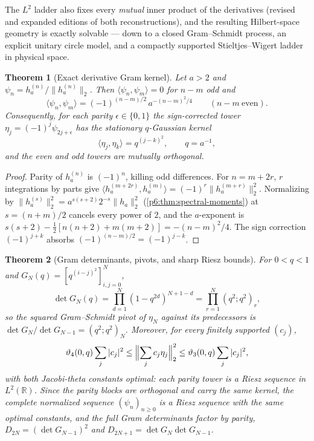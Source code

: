 \documentclass[11pt,oneside]{article}
\numberwithin{equation}{section}
\newtheorem{theorem}{Theorem}[section]
\theoremstyle{definition}
\theoremstyle{remark}
\newcommand{\R}{\mathbb R}
\begin{document}
The $L^2$ ladder also fixes every \emph{mutual} inner product of the
derivatives (revised and expanded editions of both reconstructions), and
the resulting Hilbert-space geometry is exactly solvable --- down to a
closed Gram--Schmidt process, an explicit unitary circle model, and a
compactly supported Stieltjes--Wigert ladder in physical space.

\begin{theorem}[Exact derivative Gram kernel]\label{p6:thm:derivative-gram}
Let $a>2$ and $\psi_n=h_a^{(n)}/\|h_a^{(n)}\|_2$.  Then
$\langle\psi_n,\psi_m\rangle=0$ for $n-m$ odd and
\begin{equation}\label{p6:eq:derivative-gram}
 \langle\psi_n,\psi_m\rangle
 =(-1)^{(n-m)/2}\,a^{-(n-m)^2/4}
 \qquad(n-m\ \text{even}).
\end{equation}
Consequently, for each parity $\epsilon\in\{0,1\}$ the sign-corrected tower
$\eta_j=(-1)^j\psi_{2j+\epsilon}$ has the stationary $q$-Gaussian kernel
\begin{equation}\label{p6:eq:q-gaussian-kernel}
 \boxed{\ \langle\eta_j,\eta_k\rangle=q^{(j-k)^2},
 \qquad q=a^{-1},\ }
\end{equation}
and the even and odd towers are mutually orthogonal.
\end{theorem}

\begin{proof}
Parity of $h_a^{(n)}$ is $(-1)^n$, killing odd differences.  For $n=m+2r$,
$r$ integrations by parts give
$\langle h_a^{(m+2r)},h_a^{(m)}\rangle=(-1)^r\|h_a^{(m+r)}\|_2^2$.
Normalizing by $\|h_a^{(s)}\|_2^2=a^{s(s+2)}2^{-s}\|h_a\|_2^2$
(\cref{p6:thm:spectral-moments}) at $s=(n+m)/2$ cancels every power of $2$,
and the $a$-exponent is
$s(s+2)-\tfrac12[n(n+2)+m(m+2)]=-(n-m)^2/4$.  The sign correction
$(-1)^{j+k}$ absorbs $(-1)^{(n-m)/2}=(-1)^{j-k}$.
\end{proof}

\begin{theorem}[Gram determinants, pivots, and sharp Riesz bounds]
\label{p6:thm:gram-package}
For $0<q<1$ and $G_N(q)=[q^{(i-j)^2}]_{i,j=0}^N$,
\begin{equation}\label{p6:eq:gram-determinant}
 \boxed{\ \det G_N(q)=\prod_{d=1}^{N}(1-q^{2d})^{N+1-d}
 =\prod_{r=1}^{N}(q^2;q^2)_r,\ }
\end{equation}
so the squared Gram--Schmidt pivot of $\eta_N$ against its predecessors is
$\det G_N/\det G_{N-1}=(q^2;q^2)_N$.  Moreover, for every finitely supported
$(c_j)$,
\begin{equation}\label{p6:eq:riesz-bounds}
 \vartheta_4(0,q)\sum_j|c_j|^2
 \le\Bigl\|\sum_jc_j\eta_j\Bigr\|_2^2
 \le\vartheta_3(0,q)\sum_j|c_j|^2,
\end{equation}
with both Jacobi-theta constants optimal: each parity tower is a Riesz
sequence in $L^2(\R)$.  Since the parity blocks are orthogonal and carry the
same kernel, the \emph{complete} normalized sequence $(\psi_n)_{n\ge0}$ is a
Riesz sequence with the same optimal constants, and the full Gram
determinants factor by parity,
$D_{2N}=(\det G_{N-1})^2$ and $D_{2N+1}=\det G_N\det G_{N-1}$.
\end{theorem}
\end{document}
